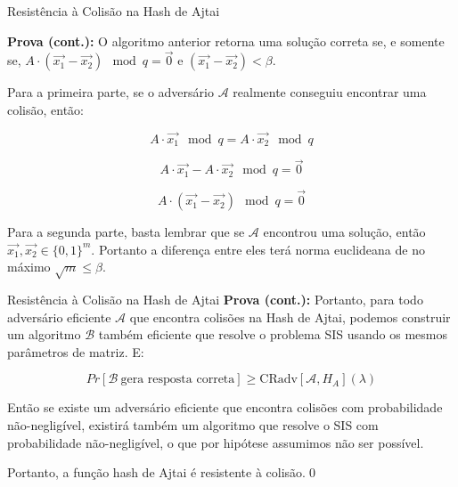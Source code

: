 \documentclass{beamer}
\begin{document}
\begin{frame}{Resistência à Colisão na Hash de Ajtai}

\textbf{Prova (cont.):} O algoritmo anterior retorna uma solução correta se, e somente se, $A \cdot (\overrightarrow{x_1}-\overrightarrow{x_2}) \mod q = \overrightarrow{0}$ e $(\overrightarrow{x_1}-\overrightarrow{x_2})< \beta$.

Para a primeira parte, se o adversário $\mathcal{A}$ realmente conseguiu encontrar uma colisão, então:

$$A\cdot\overrightarrow{x_1} \mod q= A\cdot\overrightarrow{x_2} \mod q$$

$$
A\cdot\overrightarrow{x_1} - A\cdot\overrightarrow{x_2} \mod q = \overrightarrow{0}
$$

$$
A\cdot(\overrightarrow{x_1} -\overrightarrow{x_2}) \mod q = \overrightarrow{0}
$$

Para a segunda parte, basta lembrar que se $\mathcal{A}$ encontrou uma solução, então $\overrightarrow{x_1}, \overrightarrow{x_2}\in\{0,1\}^m$. Portanto a diferença entre eles terá norma euclideana de no máximo $\sqrt{m}\leq\beta$. 
\end{frame}

\begin{frame}{Resistência à Colisão na Hash de Ajtai}
    \textbf{Prova (cont.): }Portanto, para todo adversário eficiente $\mathcal{A}$ que encontra colisões na Hash de Ajtai, podemos construir um algoritmo $\mathcal{B}$ também eficiente que resolve o problema SIS usando os mesmos parâmetros de matriz. E:
    
    $$
    Pr[\mathcal{B}\ \textrm{gera\ resposta\ correta}] \geq \textrm{CRadv}[\mathcal{A}, H_A](\lambda)
    $$
    
    Então se existe um adversário eficiente que encontra colisões com probabilidade não-negligível, existirá também um algoritmo que resolve o SIS com probabilidade não-negligível, o que por hipótese assumimos não ser possível.

    Portanto, a função hash de Ajtai é resistente à colisão.\qed

\end{frame}
\end{document}
